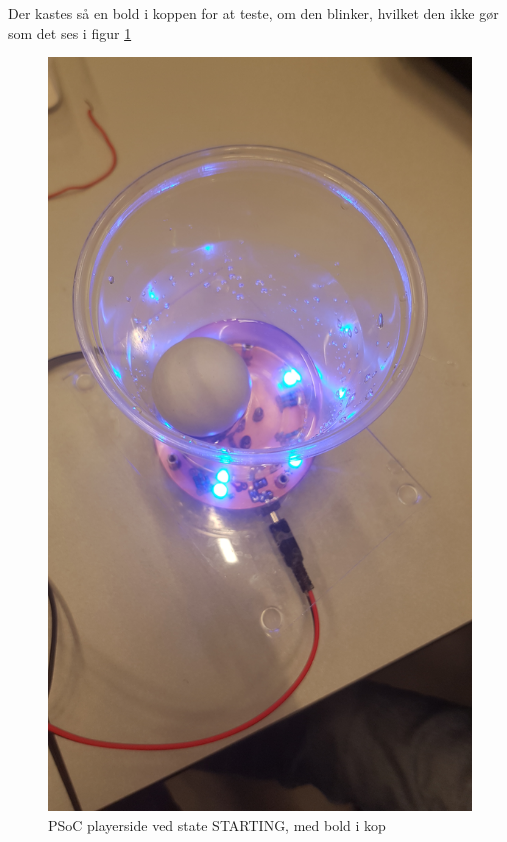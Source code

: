 \documentclass[Integrationstest/Integrationstest_main.tex]{subfiles}
\begin{document}
Der kastes så en bold i koppen for at teste, om den blinker, hvilket den ikke gør som det ses i figur \ref{fig:int_playerside_starting_no_blink}
\begin{figure}[H]
    \centering
    \includegraphics[width=\textwidth]{Integrationstest/Integrationstest_PlayerSide/graphics/CupSensorInt/STARTING_no_blink.jpg}
    \caption{PSoC playerside ved state STARTING, med bold i kop}
    \label{fig:int_playerside_starting_no_blink}
\end{figure}
\end{document}

